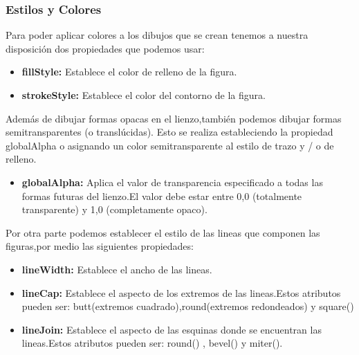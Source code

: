 \subsubsection*{Estilos y Colores}
Para poder aplicar colores a los dibujos que se crean tenemos a nuestra disposición dos propiedades que podemos usar:
\begin{itemize}
\item \textbf{fillStyle:} Establece el color de relleno de la figura.
\item \textbf{strokeStyle:} Establece el color del contorno de la figura.
\end{itemize}
Además de dibujar formas opacas en el lienzo,también podemos dibujar formas semitransparentes (o translúcidas). Esto se realiza  estableciendo la propiedad globalAlpha o asignando un color semitransparente al estilo de trazo y / o de relleno.
\begin{itemize}
\item \textbf{globalAlpha:} Aplica el valor de transparencia especificado a todas las formas futuras del lienzo.El valor debe estar entre 0,0 (totalmente transparente) y 1,0 (completamente opaco).
\end{itemize}
Por otra parte podemos establecer el estilo de las lineas que componen las figuras,por medio las siguientes propiedades:
\begin{itemize}
\item \textbf{lineWidth:} Establece el ancho de las lineas.
\item \textbf{lineCap:} Establece el aspecto de los extremos de las lineas.Estos atributos pueden ser: butt(extremos cuadrado),round(extremos redondeados) y square()
\item \textbf{lineJoin:} Establece el aspecto de las esquinas donde se encuentran las lineas.Estos atributos pueden ser: round() , bevel() y miter().
\end{itemize}
